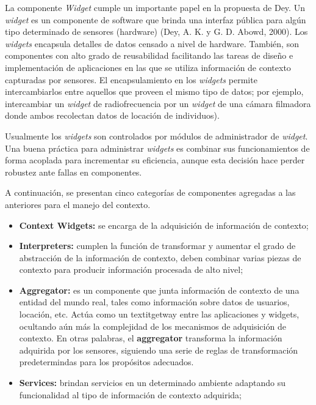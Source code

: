 {La componente \textit{Widget} cumple un importante papel en la propuesta de Dey. Un \textit{widget} es un componente de software que brinda una interfaz pública para algún tipo determinado de sensores (hardware) (Dey, A. K. y G. D. Abowd, 2000). Los \textit{widgets} encapsula detalles de datos censado a nivel de hardware. También, son componentes con alto grado de reusabilidad facilitando las tareas de diseño e implementación de aplicaciones en las que se utiliza información de contexto capturadas por sensores. El encapsulamiento en los \textit{widgets} permite intercambiarlos entre aquellos que proveen el mismo tipo de datos; por ejemplo, intercambiar un \textit{widget} de radiofrecuencia por un \textit{widget} de una cámara filmadora donde ambos recolectan datos de locación de individuos).

Usualmente los \textit{widgets} son controlados por módulos de administrador de \textit{widget}. Una buena práctica para administrar \textit{widgets} es combinar sus funcionamientos de forma acoplada para incrementar su eficiencia, aunque esta decisión hace perder robustez ante fallas en componentes.

A continuación, se presentan cinco categorías de componentes agregadas a las anteriores para el manejo del contexto.


\begin{itemize}


 \item \textbf{Context Widgets:} se encarga de la adquisición de información de contexto; 

\item \textbf{Interpreters:} cumplen la función de transformar y aumentar el grado de abstracción de la información de contexto, deben combinar varias piezas de contexto para producir información procesada de alto nivel;


\item \textbf{Aggregator:} es un componente que junta información de contexto de una entidad del mundo real, tales como información sobre datos de usuarios, locación, etc. Actúa como un textit{getway} entre las aplicaciones y  widgets, ocultando aún más la complejidad de los mecanismos de adquisición de contexto. En otras palabras, el \textbf{aggregator} transforma la información adquirida por los sensores, siguiendo una serie de reglas de transformación predetermindas para los propósitos adecuados.


\item \textbf{Services:} brindan servicios en un determinado ambiente
adaptando su funcionalidad al tipo de información de contexto adquirida; 


\end{itemize}}
